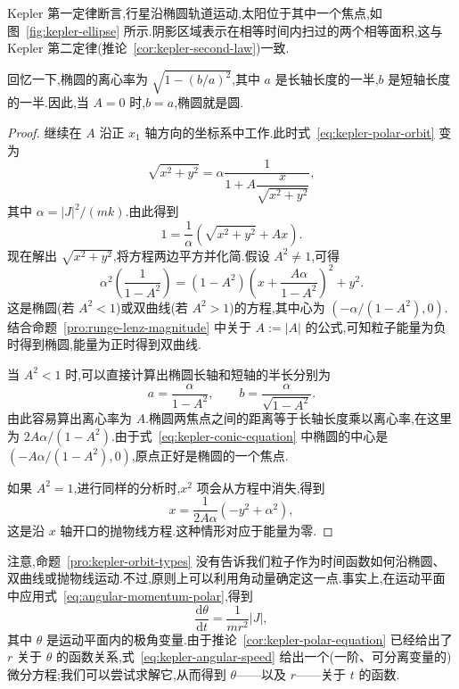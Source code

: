 Kepler 第一定律断言,行星沿椭圆轨道运动,太阳位于其中一个焦点,如图~\ref{fig:kepler-ellipse} 所示.阴影区域表示在相等时间内扫过的两个相等面积,这与 Kepler 第二定律(推论~\ref{cor:kepler-second-law})一致.

回忆一下,椭圆的离心率为 $\sqrt{1-(b/a)^{2}}$,其中 $a$ 是长轴长度的一半,$b$ 是短轴长度的一半.因此,当 $A=0$ 时,$b=a$,椭圆就是圆.

\begin{proof}
继续在 $A$ 沿正 $x_{1}$ 轴方向的坐标系中工作.此时式~\eqref{eq:kepler-polar-orbit} 变为
\[
  \sqrt{x^{2}+y^{2}}=\alpha\frac{1}{1+A\dfrac{x}{\sqrt{x^{2}+y^{2}}}},
\]
其中 $\alpha=\lvert J\rvert^{2}/(mk)$.由此得到
\[
  1=\frac1\alpha\left(\sqrt{x^{2}+y^{2}}+Ax\right).
\]
现在解出 $\sqrt{x^{2}+y^{2}}$,将方程两边平方并化简.假设 $A^{2}\neq1$,可得
\begin{equation}
  \alpha^{2}\left(\frac{1}{1-A^{2}}\right)
  =(1-A^{2})\left(x+\frac{A\alpha}{1-A^{2}}\right)^{2}+y^{2}.
  \label{eq:kepler-conic-equation}
\end{equation}
这是椭圆(若 $A^{2}<1$)或双曲线(若 $A^{2}>1$)的方程,其中心为 $(-\alpha/(1-A^{2}),0)$.结合命题~\ref{pro:runge-lenz-magnitude} 中关于 $A:=\lvert A\rvert$ 的公式,可知粒子能量为负时得到椭圆,能量为正时得到双曲线.

当 $A^{2}<1$ 时,可以直接计算出椭圆长轴和短轴的半长分别为
\[
  a=\frac{\alpha}{1-A^{2}},
  \qquad
  b=\frac{\alpha}{\sqrt{1-A^{2}}}.
\]
由此容易算出离心率为 $A$.椭圆两焦点之间的距离等于长轴长度乘以离心率,在这里为 $2A\alpha/(1-A^{2})$.由于式~\eqref{eq:kepler-conic-equation} 中椭圆的中心是 $( -A\alpha/(1-A^{2}),0)$,原点正好是椭圆的一个焦点.

如果 $A^{2}=1$,进行同样的分析时,$x^{2}$ 项会从方程中消失,得到
\[
  x=\frac{1}{2A\alpha}\left(-y^{2}+\alpha^{2}\right),
\]
这是沿 $x$ 轴开口的抛物线方程.这种情形对应于能量为零.
\end{proof}

注意,命题~\ref{pro:kepler-orbit-types} 没有告诉我们粒子作为时间函数如何沿椭圆、双曲线或抛物线运动.不过,原则上可以利用角动量确定这一点.事实上,在运动平面中应用式~\eqref{eq:angular-momentum-polar},得到
\begin{equation}
  \frac{\mathrm{d}\theta}{\mathrm{d}t}=\frac{1}{mr^{2}}\lvert J\rvert,
  \label{eq:kepler-angular-speed}
\end{equation}
其中 $\theta$ 是运动平面内的极角变量.由于推论~\ref{cor:kepler-polar-equation} 已经给出了 $r$ 关于 $\theta$ 的函数关系,式~\eqref{eq:kepler-angular-speed} 给出一个(一阶、可分离变量的)微分方程;我们可以尝试求解它,从而得到 $\theta$——以及 $r$——关于 $t$ 的函数.

